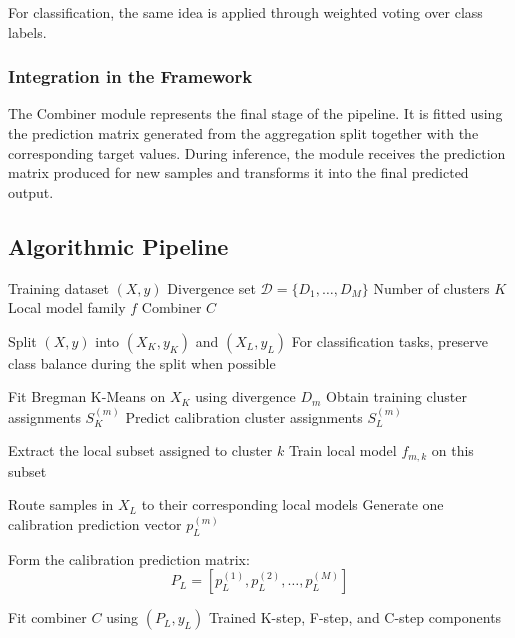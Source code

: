 For classification, the same idea is applied through weighted voting over class labels.




\subsubsection*{Integration in the Framework}

The Combiner module represents the final stage of the \KFCProcedure{} pipeline. It is fitted using the prediction matrix generated from the aggregation split together with the corresponding target values. During inference, the module receives the prediction matrix produced for new samples and transforms it into the final predicted output.

\subsection{Algorithmic Pipeline}

\begin{algorithm}[H]
    \caption{KFCProcedure Training Procedure}
    \label{alg:kfc_training}
    \begin{algorithmic}[1]
        \Require Training dataset $(X,y)$
        \Require Divergence set $\mathcal{D}=\{D_1,\dots,D_M\}$
        \Require Number of clusters $K$
        \Require Local model family $f$
        \Require Combiner $C$

        \State Split $(X,y)$ into $(X_K,y_K)$ and $(X_L,y_L)$
        \State For classification tasks, preserve class balance during the split when possible

        \State Fit Bregman K-Means on $X_K$ using divergence $D_m$
        \State Obtain training cluster assignments $S_K^{(m)}$
        \State Predict calibration cluster assignments $S_L^{(m)}$

        \State Extract the local subset assigned to cluster $k$
        \State Train local model $f_{m,k}$ on this subset
        \EndFor

        \State Route samples in $X_L$ to their corresponding local models
        \State Generate one calibration prediction vector $p_L^{(m)}$
        \EndFor

        \State Form the calibration prediction matrix:
        \[
            P_L = \left[p_L^{(1)}, p_L^{(2)}, \dots, p_L^{(M)}\right]
        \]

        \State Fit combiner $C$ using $(P_L,y_L)$
        \State \Return Trained K-step, F-step, and C-step components
    \end{algorithmic}
\end{algorithm}

